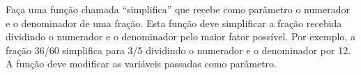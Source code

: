 
\question[10]

Faça uma função chamada ``simplifica'' que recebe como parâmetro o numerador e o denominador de uma fração. Esta função deve simplificar a fração recebida dividindo o numerador e o denominador pelo maior fator possível. Por exemplo, a fração 36/60 simplifica para 3/5 dividindo o numerador e o denominador por 12. A função deve modificar as variáveis passadas como parâmetro.
